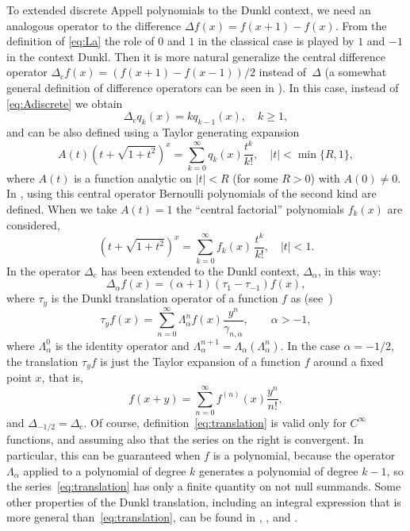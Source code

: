 \documentclass[11pt,a4paper]{article}
\theoremstyle{plain}
\theoremstyle{remark}
\newcommand{\La}{\Lambda_{\alpha}}
\newcommand{\cc}{\gamma}
\begin{document}
To extended discrete Appell polynomials to the Dunkl context, we need an analogous operator to the difference $\Delta f(x)=f(x+1)-f(x)$. From the definition of \eqref{eq:La} the role of $0$ and $1$ in the classical case is played by $1$ and $-1$ in the context Dunkl. Then it is more natural generalize the central difference operator $\Delta_{\mathrm{c}}f(x) = (f(x+1)-f(x-1))/2$ instead of~$\Delta$ (a somewhat general definition of difference operators can be seen in \cite[Section~2.1]{Simsek2}). In this case, instead of \eqref{eq:Adiscrete} we obtain 
\begin{equation}
	\label{eq:clascentral}
	\Delta_{\mathrm{c}} q_k(x) = kq_{k-1}(x),\quad k\ge 1,
\end{equation}
and can be also defined using a Taylor generating expansion
\[
  A(t)(t+\sqrt{1+t^2})^x = \sum_{k=0}^{\infty} q_k(x) \frac{t^k}{k!},
  \quad |t| < \min\{R,1\},
\]
where $A(t)$ is a function analytic on $|t|<R$ (for some $R>0$) with $A(0)\ne 0$. In \cite{Tem}, using this central operator  Bernoulli polynomials of the second kind are defined. When we take $A(t) = 1$ the ``central factorial'' polynomials $f_k(x)$ are considered,
\[
  (t+\sqrt{1+t^2})^x = \sum_{k=0}^{\infty} f_k(x) \, \frac{t^k}{k!},
  \quad |t| < 1.
\]
In \cite{ELMV} the operator $\Delta_{\mathrm{c}}$ has been extended to the Dunkl context, $\Delta_{\alpha}$, in this way:
\[
  \Delta_{\alpha}f(x) = (\alpha+1)(\tau_1-\tau_{-1})f(x),
\]
where $\tau_y$ is the Dunkl translation operator of a function $f$ as (see~\cite{Ros})
\begin{equation}
\label{eq:translation}
  \tau_y f(x) = \sum_{n=0}^\infty \La^{n}f(x) \frac{y^n}{\cc_{n,\alpha}},
  \qquad \alpha>-1,
\end{equation}
where $\La^0$ is the identity operator and $\La^{n+1} = \La(\La^n)$. 
In the case $\alpha=-1/2$, the translation $\tau_y f$ is just the Taylor expansion of a function $f$ around a fixed point $x$, that is,
\[
  f(x+y) = \sum_{n=0}^\infty f^{(n)}(x) \frac{y^n}{n!},
\]
and $\Delta_{-1/2}=\Delta_{\mathrm{c}}$. Of course, definition~\eqref{eq:translation} is valid only for $C^{\infty}$ functions, and assuming also that the series on the right is convergent. In particular, this can be guaranteed when $f$ is a polynomial, because the operator $\La$ applied to a polynomial of degree $k$ generates a polynomial of degree $k-1$, so the series~\eqref{eq:translation} has only a finite quantity on not null summands. 
Some other properties of the Dunkl translation, including an integral expression that is more general than~\eqref{eq:translation}, can be found in \cite{Ros}, \cite{Rosler}, and \cite{ThX}.
\end{document}
